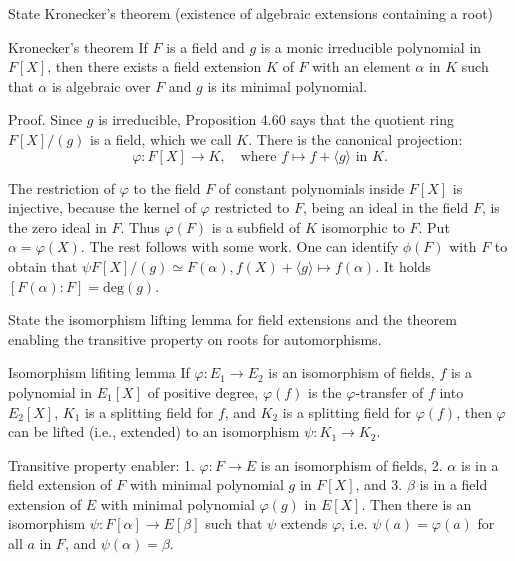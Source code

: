 State Kronecker’s theorem (existence of algebraic extensions containing a root)

Kronecker’s theorem
If \( F \) is a field and \( g \) is a monic irreducible polynomial in \( F[X] \), then there exists a field extension \( K \) of \( F \) with an element \( \alpha \) in \( K \) such that \( \alpha \) is algebraic over \( F \) and \( g \) is its minimal polynomial.

Proof. Since \( g \) is irreducible, Proposition 4.60 says that the quotient ring \( F[X]/(g) \) is a field, which we call \( K \).
There is the canonical projection:
\[
\varphi : F[X] \to K, \quad \text{where } f \mapsto f + \langle g \rangle \text{ in } K.
\]

The restriction of \( \varphi \) to the field \( F \) of constant polynomials inside \( F[X] \) is injective, because the kernel of \( \varphi \) 
restricted to \( F \), being an ideal in the field \( F \), is the zero ideal in \( F \). 
Thus \( \varphi(F) \) is a subfield of \( K \) isomorphic to \( F \).
Put \( \alpha = \varphi(X) \). The rest follows with some work. 
One can identify \( \phi(F) \) with \( F \) to obtain that \(\psi F[X]/(g) \simeq F(\alpha), f(X) + \langle g \rangle \mapsto f(\alpha) \).
It holds \( [F(\alpha):F] = \text{deg}(g) \).


State the isomorphism lifting lemma for field extensions and the theorem enabling the transitive property on roots 
for automorphisms.

Isomorphism lifiting lemma
If
\( \varphi : E_1 \to E_2 \) is an isomorphism of fields,
\( f \) is a polynomial in \( E_1[X] \) of positive degree,
\( \varphi(f) \) is the \( \varphi \)-transfer of \( f \) into \( E_2[X] \),
\( K_1 \) is a splitting field for \( f \), and \( K_2 \) is a splitting field for \( \varphi(f) \),
then \( \varphi \) can be lifted (i.e., extended) to an isomorphism \( \psi : K_1 \to K_2 \).

Transitive property enabler:
1. \( \varphi : F \to E \) is an isomorphism of fields,
2. \( \alpha \) is in a field extension of \( F \) with minimal polynomial \( g \) in \( F[X] \), and
3. \( \beta \) is in a field extension of \( E \) with minimal polynomial \( \varphi(g) \) in \( E[X] \).
Then there is an isomorphism \( \psi : F[\alpha] \to E[\beta] \) such that
\( \psi \) extends \( \varphi \), i.e. \( \psi(a) = \varphi(a) \) for all \( a \) in \( F \), and \( \psi(\alpha) = \beta \).
